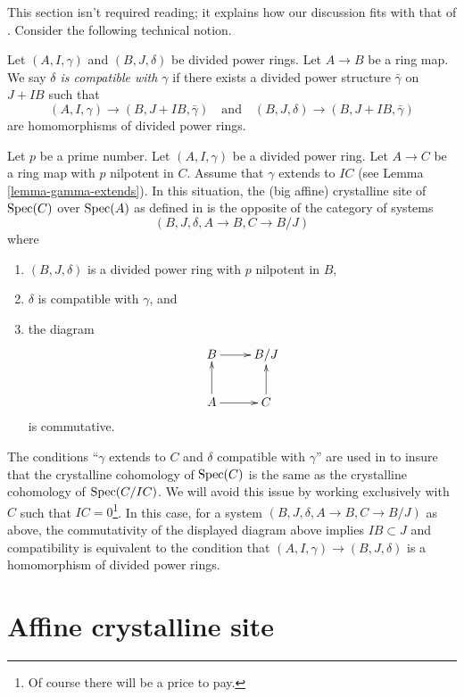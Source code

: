 \noindent
This section isn't required reading; it explains how our discussion
fits with that of \cite{Berthelot}.
Consider the following technical notion.

\begin{definition}
\label{definition-compatible}
Let $(A, I, \gamma)$ and $(B, J, \delta)$ be divided power rings.
Let $A \to B$ be a ring map. We say
{\it $\delta$ is compatible with $\gamma$}
if there exists a divided power structure $\bar\gamma$ on
$J + IB$ such that
$$
(A, I, \gamma) \to (B, J + IB, \bar \gamma)\quad\text{and}\quad
(B, J, \delta) \to (B, J + IB, \bar \gamma)
$$
are homomorphisms of divided power rings.
\end{definition}

\noindent
Let $p$ be a prime number. Let $(A, I, \gamma)$ be a divided power ring.
Let $A \to C$ be a ring map with $p$ nilpotent in $C$.
Assume that $\gamma$ extends to $IC$ (see
Lemma \ref{lemma-gamma-extends}).
In this situation, the (big affine) crystalline site of
$\mathop{\rm Spec}(C)$ over $\mathop{\rm Spec}(A)$
as defined in \cite{Berthelot} 
is the opposite of the category of systems
$$
(B, J, \delta, A \to B, C \to B/J)
$$
where
\begin{enumerate}
\item $(B, J, \delta)$ is a divided power ring with $p$ nilpotent in $B$,
\item $\delta$ is compatible with $\gamma$, and
\item the diagram
$$
\xymatrix{
B \ar[r] & B/J \\
A \ar[u] \ar[r] & C \ar[u]
}
$$
is commutative.
\end{enumerate}
The conditions
``$\gamma$ extends to $C$ and $\delta$ compatible with $\gamma$''
are used in \cite{Berthelot} to insure that
the crystalline cohomology of $\mathop{\rm Spec}(C)$ is the same as the crystalline
cohomology of $\mathop{\rm Spec}(C/IC)$. We will avoid this issue
by working exclusively with $C$ such that $IC = 0$\footnote{Of course there
will be a price to pay.}. In this case,
for a system $(B, J, \delta, A \to B, C \to B/J)$ as above,
the commutativity of the displayed diagram above implies $IB \subset J$ and
compatibility is equivalent to the condition that
$(A, I, \gamma) \to (B, J, \delta)$ is a homomorphism of divided
power rings.




\section{Affine crystalline site}
\label{section-affine-site}


